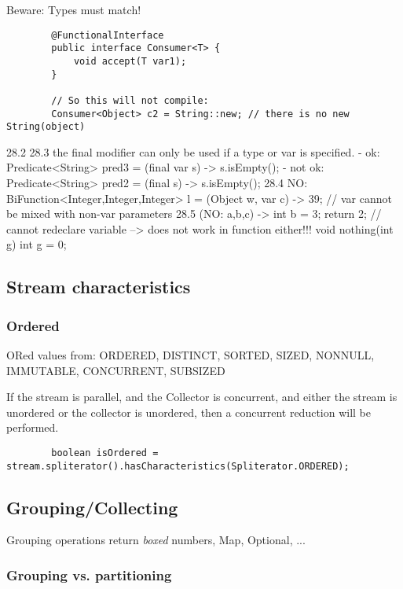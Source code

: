 \documentclass{scrartcl}
\begin{document}
    Beware: Types must match!

    \begin{lstlisting}
        @FunctionalInterface
        public interface Consumer<T> {
            void accept(T var1);
        }

        // So this will not compile:
        Consumer<Object> c2 = String::new; // there is no new String(object)
    \end{lstlisting}


    28.2
    28.3 the final modifier can only be used if a type or var is specified.
    - ok: Predicate<String> pred3 = (final var s) -­> s.isEmpty();
    - not ok: Predicate<String> pred2 = (final s) -­> s.isEmpty();
    28.4 NO: BiFunction<Integer,Integer,Integer> l = (Object w, var c) -> 39; // var cannot be mixed with non-var parameters
    28.5 (NO: a,b,c) -­> {int b = 3; return 2;} // cannot redeclare variable
    --> does not work in function either!!!
    void nothing(int g) {
        int g = 0;
    }
\subsection{Stream characteristics}
\subsubsection{Ordered}

    ORed values from: ORDERED, DISTINCT, SORTED, SIZED, NONNULL, IMMUTABLE, CONCURRENT, SUBSIZED

    If the stream is parallel, and the Collector is concurrent,
    and either the stream is unordered or the collector is unordered,
    then a concurrent reduction will be performed.

    \begin{lstlisting}
        boolean isOrdered = stream.spliterator().hasCharacteristics(Spliterator.ORDERED);
    \end{lstlisting}

\subsection{Grouping/Collecting}

    Grouping operations return \textit{boxed} numbers, Map, Optional, ...

\subsubsection{Grouping vs. partitioning}
\end{document}
